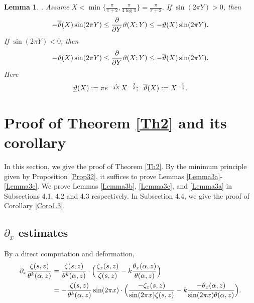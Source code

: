 \documentclass[reqno,english]{amsart}
\newtheorem{lemma}{Lemma}[section]
\newtheorem{open problem}{Open Problem}[section]
\newtheorem{open question}{Open Question}[section]
\newtheorem{open questions on hexagonal lattice}{Open Questions on hexagonal lattice}[section]
\begin{document}
\begin{lemma}\label{LemmaT2}\cite{LW2022}.
Assume $X<\min\{\frac{\pi}{\pi+2},\frac{\pi}{4\log\pi}\}=\frac{\pi}{\pi+2}$. If $\sin(2\pi Y)>0$, then
\begin{equation}\aligned\nonumber
-\overline\vartheta(X)\sin(2\pi Y)\leq\frac{\partial}{\partial Y}\vartheta(X;Y)\leq-\underline\vartheta(X)\sin(2\pi Y).
 \endaligned\end{equation}
If $\sin(2\pi Y)<0$, then
\begin{equation}\aligned\nonumber
-\underline\vartheta(X)\sin(2\pi Y)\leq\frac{\partial}{\partial Y}\vartheta(X;Y)\leq-\overline\vartheta(X)\sin(2\pi Y).
 \endaligned\end{equation}
Here
\begin{equation}\aligned\nonumber
\underline\vartheta(X):=\pi e^{-\frac{\pi}{4X}}X^{-\frac{3}{2}};\;\; \overline\vartheta(X):=X^{-\frac{3}{2}}.
 \endaligned\end{equation}


\end{lemma}



\section{Proof of Theorem \ref{Th2} and its corollary}
\setcounter{equation}{0}

In this section, we give the proof of Theorem \ref{Th2}. By the minimum principle given by Proposition \ref{Prop32}, it suffices to prove Lemmas \ref{Lemma3a}-\ref{Lemma3c}. We prove Lemmas \ref{Lemma3b}, \ref{Lemma3c}, and \ref{Lemma3a} in Subsections 4.1, 4.2 and 4.3 respectively. In Subsection 4.4, we give the proof of Corollary \ref{Coro1.3}.



\subsection{$\partial_x$ estimates}
By a direct computation and deformation,
\begin{equation}\aligned\nonumber
\partial_x\frac{\zeta(s,z)}{\theta^k(\alpha,z)}
&=\frac{\zeta(s,z)}{\theta^k(\alpha,z)}\cdot
\Big(
\frac{\zeta_x(s,z)}{\zeta(s,z)}-k\frac{\theta_x(\alpha,z)}{\theta(\alpha,z)}
\Big)\\
&=-\frac{\zeta(s,z)}{\theta^k(\alpha,z)}\sin(2\pi x)\cdot
\Big(
\frac{-\zeta_x(s,z)}{\sin(2\pi x)\zeta(s,z)}-k\frac{-\theta_x(\alpha,z)}{\sin(2\pi x)\theta(\alpha,z)}
\Big).
\endaligned\end{equation}
\end{document}

